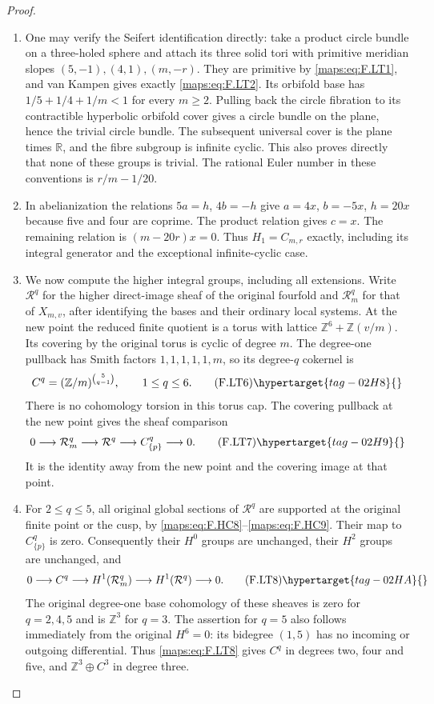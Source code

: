 \begin{proof}
\begin{enumerate}[label={$\langle1\rangle$\arabic*.}]
\item One may verify the Seifert identification directly:
take a product circle bundle on a three-holed sphere
and attach its three solid tori with primitive meridian
slopes $(5,-1),(4,1),(m,-r)$.
They are primitive by \eqref{maps:eq:F.LT1}, and van Kampen gives
exactly \eqref{maps:eq:F.LT2}.
Its orbifold base has
$1/5+1/4+1/m<1$ for every $m\ge2$.
Pulling back the circle fibration to its contractible
hyperbolic orbifold cover gives a circle bundle on
the plane, hence the trivial circle bundle.
The subsequent universal cover is the plane times
$\mathbb R$, and the fibre subgroup is infinite cyclic.
This also proves directly that none of these groups
is trivial.
The rational Euler number in these conventions is
$r/m-1/20$.

\item In abelianization the relations $5a=h$, $4b=-h$
give $a=4x$, $b=-5x$, $h=20x$ because five and four
are coprime.
The product relation gives $c=x$.
The remaining relation is $(m-20r)x=0$.
Thus $H_1=C_{m,r}$ exactly, including its integral
generator and the exceptional infinite-cyclic case.

\item We now compute the higher integral groups, including
all extensions.
Write $\mathcal R^q$ for the higher direct-image
sheaf of the original fourfold and
$\mathcal R_m^q$ for that of $X_{m,v}$, after identifying
the bases and their ordinary local systems.
At the new point the reduced finite quotient is a
torus with lattice
$\mathbb Z^6+\mathbb Z(v/m)$.
Its covering by the original torus is cyclic of
degree $m$.
The degree-one pullback has Smith factors
$1,1,1,1,1,m$, so its degree-$q$ cokernel is
\[
 C^q=(\mathbb Z/m)^{\binom5{q-1}},
 \qquad 1\le q\le6 .
\tag{F.LT6}\hypertarget{tag-02H8}{}\label{maps:eq:F.LT6}
\]
There is no cohomology torsion in this torus cap.
The covering pullback at the new point gives the sheaf comparison
\[
 0\longrightarrow\mathcal R_m^q
  \longrightarrow\mathcal R^q
  \longrightarrow C^q_{\{p\}}\longrightarrow0 .
\tag{F.LT7}\hypertarget{tag-02H9}{}\label{maps:eq:F.LT7}
\]
It is the identity away from the new point and the
covering image at that point.

\item For $2\le q\le5$, all original global sections of
$\mathcal R^q$ are supported at the original finite
point or the cusp, by \eqref{maps:eq:F.HC8}--\eqref{maps:eq:F.HC9}.
Their map to $C^q_{\{p\}}$ is zero.
Consequently their $H^0$ groups are unchanged,
their $H^2$ groups are unchanged, and
\[
 0\longrightarrow C^q
  \longrightarrow H^1(\mathcal R_m^q)
  \longrightarrow H^1(\mathcal R^q)
  \longrightarrow0 .
\tag{F.LT8}\hypertarget{tag-02HA}{}\label{maps:eq:F.LT8}
\]
The original degree-one base cohomology of these
sheaves is zero for $q=2,4,5$ and is $\mathbb Z^3$
for $q=3$.
The assertion for $q=5$ also follows immediately
from the original $H^6=0$: its bidegree $(1,5)$
has no incoming or outgoing differential.
Thus \eqref{maps:eq:F.LT8} gives $C^q$ in degrees two, four and
five, and $\mathbb Z^3\oplus C^3$ in degree three.


\end{enumerate}
\end{proof}
